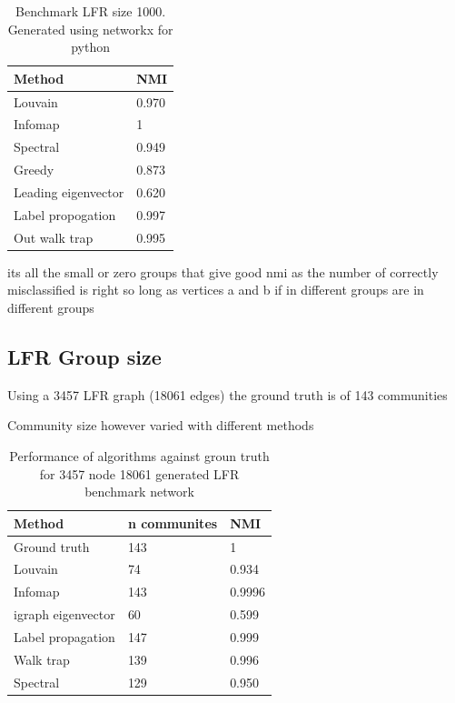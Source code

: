 \begin{table}[h]
    \centering
    \begin{tabular}{ll}
    \toprule
     Method    & NMI  \\
     \midrule
    Louvain     & 0.970\\
    Infomap     & 1\\
    Spectral & 0.949\\
    Greedy & 0.873\\
    Leading eigenvector & 0.620\\
    Label propogation & 0.997\\
    Out walk trap & 0.995\\
    \bottomrule
    \end{tabular}
    \caption{Benchmark LFR size 1000. Generated using networkx for python}
    \label{tab:benchmark LFR size 1000}
\end{table}







its all the small or zero groups that give good nmi as the number of correctly misclassified is right so long as vertices a and b if in different groups are in different groups 

\subsection{LFR Group size}

Using a 3457 LFR graph (18061 edges) the ground truth is of 143 communities

Community size however varied with different methods


\begin{table}[]
    \centering
    \begin{tabular}{lll}
    \toprule
        Method & n communites & NMI  \\
        \midrule
        Ground truth  & 143 & 1 \\
        Louvain & 74 & 0.934 \\
        Infomap & 143 & 0.9996 \\
        igraph eigenvector & 60 & 0.599\\
        Label propagation & 147 & 0.999\\
        Walk trap & 139 & 0.996\\
        Spectral & 129 & 0.950\\
        \bottomrule
    \end{tabular}
    \caption{Performance of algorithms against groun truth for 3457 node 18061 generated LFR benchmark network}
    \label{tab:benchmark Performance of algorithms against groun truth for 3457 node 18061 generated LFR benchmark network}
\end{table}

